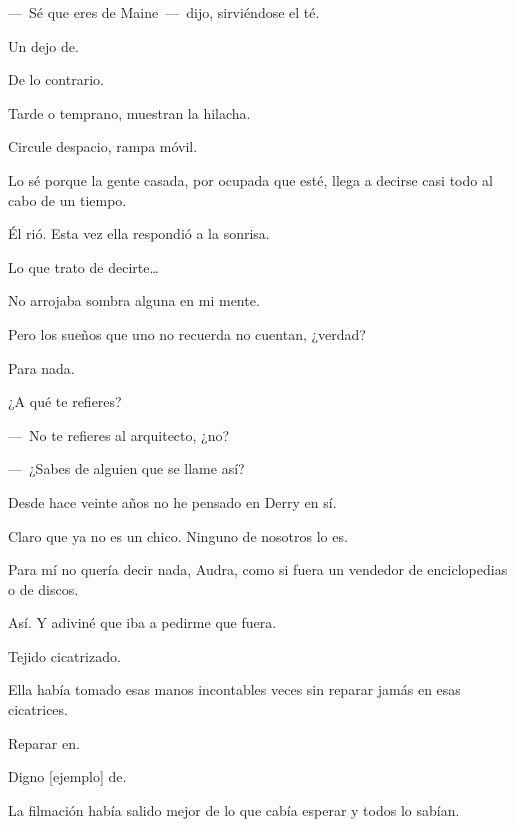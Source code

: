 \sk
---~Sé que eres de Maine~---~dijo, sirviéndose el té.  \nb{}

\sk
Un dejo de. 

\sk
De lo contrario. 

\sk
Tarde o temprano, muestran la hilacha. 

\sk
 Circule despacio, rampa móvil. 

\sk
Lo sé porque la gente casada, por ocupada que esté, llega a decirse casi todo al cabo de un tiempo. 

\sk
Él rió. Esta vez ella respondió a la sonrisa. \nb{}

\sk
Lo que trato de decirte\ldots{} 

\sk
No arrojaba sombra alguna en mi mente. 

\sk
Pero los sueños que uno no recuerda no cuentan, ¿verdad? \nb{}

\sk
Para nada. 

\sk
¿A qué te refieres? 

\sk
---~No te refieres al arquitecto, ¿no?

---~¿Sabes de alguien que se llame así?

\sk
Desde hace veinte años no he pensado en Derry en sí. 

\sk
Claro que ya no es un chico. Ninguno de nosotros lo es.\nb{}

\sk
Para mí no quería decir nada, Audra, como si fuera un vendedor de enciclopedias o de discos.\nb{}

\sk
 Así. Y adiviné que iba a pedirme que fuera. \nb{}

\sk
Tejido cicatrizado. 

\sk
Ella había tomado esas manos incontables veces sin reparar jamás en esas cicatrices.\nb{}

\sk
Reparar en. 

\sk
Digno [ejemplo] de. 

\sk
La filmación había salido mejor de lo que cabía esperar y todos lo sabían. 

